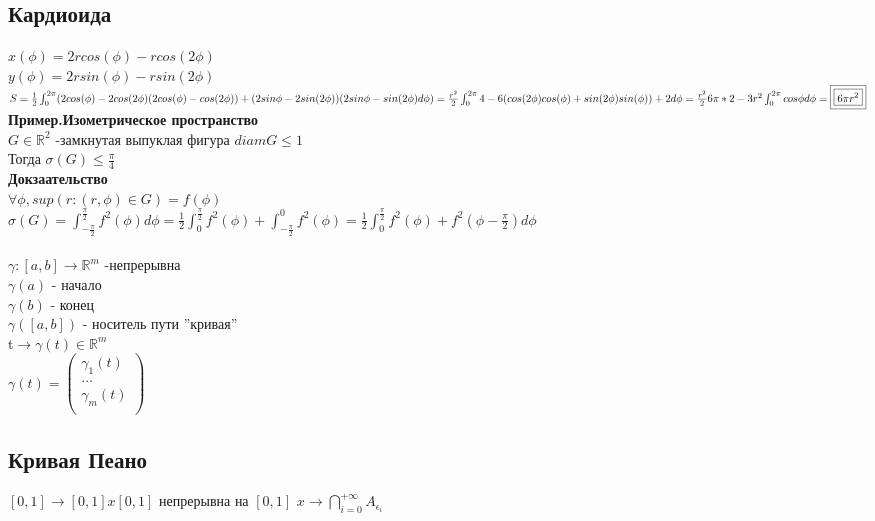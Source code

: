 \documentclass[12pt, a4paper]{article}
\newcommand{\nl}{\newline}
\begin{document}
\subsection{Кардиоида}
    $x(\phi)= 2 r cos(\phi) - r cos(2\phi)$\\
    $y(\phi)= 2 r sin(\phi) - r sin(2\phi)$\\
    $S = \frac{1}{2}\int_{0}^{2\pi}(2cos(\phi)-2cos( 2\phi )( 2cos( \phi )-cos( 2\phi )) + (2sin\phi -2 sin(2\phi))(2sin\phi - sin(2\phi)d\phi) = \frac{r^2}{2}\int_{0}^{2\pi}4 -6( cos(2\phi)cos(\phi) + sin(2\phi)sin(\phi)) +2 d\phi = \frac{r^2}{2}6\pi * 2 - 3r^2\int_{0}^{2\pi}cos\phi d\phi =  \boxed{\boxed{6\pi r^2 }}\\
     $
    \\
\textbf{Пример.Изометрическое пространство}\\
      $G \in \mathbb{R}^2$ -замкнутая выпуклая фигура
     $diam G\leq 1$\\ Тогда $\sigma(G) \leq \frac{\pi}{4}$\\
 \textbf{Докзаательство}\\
    $\forall \phi , sup(r : (r, \phi) \in G )= f(\phi)$ \\
    $\sigma(G)=\int_{-\frac{\pi}{2}}^{\frac{\pi}{2}}f^2(\phi) d\phi = \frac{1}{2}\int_{0}^{\frac{\pi}{2}}f^2(\phi)+\int_{-\frac{\pi}{2}}^{0}f^2(\phi)=\frac{1}{2}\int_{0}^{\frac{\pi}{2}}f^2(\phi) + f^2(\phi-\frac{\pi}{2})   d\phi$ \\
\\
    $\gamma : [a,b] \rightarrow \mathbb{R}^m$ -непрерывна\\
    $\gamma(a)$ - начало \\
    $\gamma(b)$ - конец \\
    $\gamma([a,b])$ - носитель пути ''кривая'' \\
    t$\rightarrow \gamma(t) \in \mathbb{R}^m$ \\
    $\gamma(t)= 
    \begin{pmatrix}
        \gamma_1(t)\\
        \dots \\
        \gamma_m(t)\\
    \end{pmatrix}$
    
\subsection{Кривая Пеано}
$[0,1] \rightarrow [0,1]x[0,1]$ непрерывна на  $[0,1]$\nl
$x \rightarrow \bigcap_{i=0}^{+\infty}A_{\epsilon_i}$ \nl
    
\end{document}
